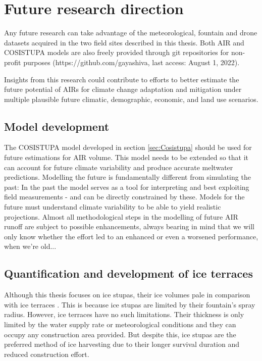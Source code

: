 \section{Future research direction}

Any future research can take advantage of the meteorological, fountain and drone datasets acquired in the two field
sites described in this thesis. Both AIR and COSISTUPA models are also freely provided through git repositories
for non-profit purposes (https://github.com/gayashiva, last access: August 1, 2022).

Insights from this research could contribute to efforts to better estimate the future potential of AIRs for
climate change adaptation and mitigation under multiple plausible future climatic, demographic, economic, and
land use scenarios. 

\subsection{Model development}

The COSISTUPA model developed in section \ref{sec:Cosistupa} should be used for future estimations for AIR volume. This model
needs to be extended so that it can account for future climate variability and produce accurate meltwater
predictions. Modelling the future is fundamentally different from simulating the past: In the past the model
serves as a tool for interpreting and best exploiting field measurements - and can be directly constrained by
these. Models for the future must understand climate variability to be able to yield realistic projections.
Almost all methodological steps in the modelling of future AIR runoff are subject to possible enhancements,
always bearing in mind that we will only know whether the effort led to an enhanced or even a worsened
performance, when we're old...

\subsection{Quantification and development of ice terraces}

Although this thesis focuses on ice stupas, their ice volumes pale in comparison with ice terraces
\citep{nusserSociohydrologyArtificialGlaciers2019}. This is because ice stupas are limited by their fountain's
spray radius. However, ice terraces have no such limitations. Their thickness is only limited by the water
supply rate or meteorological conditions and they can occupy any construction area provided. But despite this, ice
stupas are the preferred method of ice harvesting due to their longer survival duration and reduced construction
effort.

